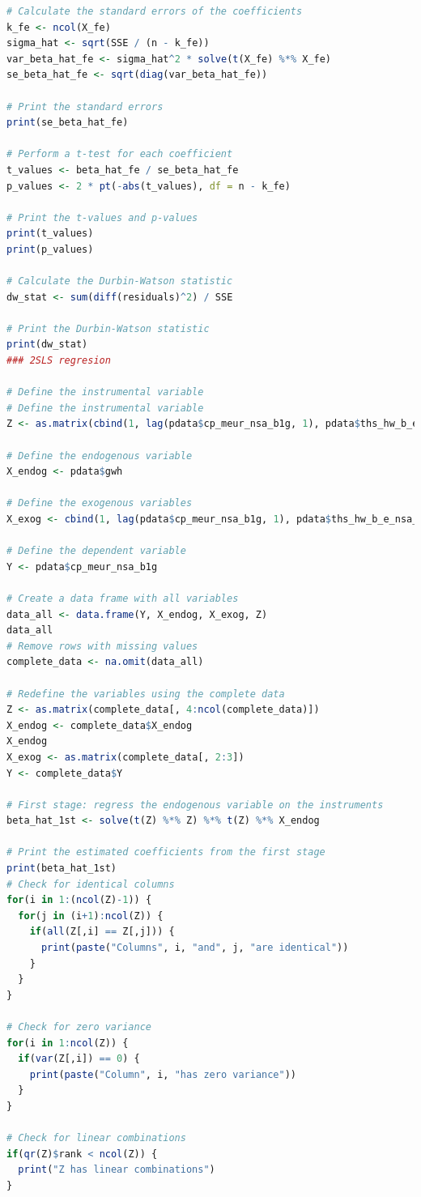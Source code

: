 \documentclass[12pt]{article}
\begin{document}
\begin{lstlisting}[language=R]
# Calculate the standard errors of the coefficients
k_fe <- ncol(X_fe)
sigma_hat <- sqrt(SSE / (n - k_fe))
var_beta_hat_fe <- sigma_hat^2 * solve(t(X_fe) %*% X_fe)
se_beta_hat_fe <- sqrt(diag(var_beta_hat_fe))

# Print the standard errors
print(se_beta_hat_fe)

# Perform a t-test for each coefficient
t_values <- beta_hat_fe / se_beta_hat_fe
p_values <- 2 * pt(-abs(t_values), df = n - k_fe)

# Print the t-values and p-values
print(t_values)
print(p_values)

# Calculate the Durbin-Watson statistic
dw_stat <- sum(diff(residuals)^2) / SSE

# Print the Durbin-Watson statistic
print(dw_stat)
### 2SLS regresion

# Define the instrumental variable
# Define the instrumental variable
Z <- as.matrix(cbind(1, lag(pdata$cp_meur_nsa_b1g, 1), pdata$ths_hw_b_e_nsa_emp_dc - pdata$exp_e7000_gwh))

# Define the endogenous variable
X_endog <- pdata$gwh

# Define the exogenous variables
X_exog <- cbind(1, lag(pdata$cp_meur_nsa_b1g, 1), pdata$ths_hw_b_e_nsa_emp_dc - pdata$exp_e7000_gwh)

# Define the dependent variable
Y <- pdata$cp_meur_nsa_b1g

# Create a data frame with all variables
data_all <- data.frame(Y, X_endog, X_exog, Z)
data_all
# Remove rows with missing values
complete_data <- na.omit(data_all)

# Redefine the variables using the complete data
Z <- as.matrix(complete_data[, 4:ncol(complete_data)])
X_endog <- complete_data$X_endog
X_endog
X_exog <- as.matrix(complete_data[, 2:3])
Y <- complete_data$Y

# First stage: regress the endogenous variable on the instruments
beta_hat_1st <- solve(t(Z) %*% Z) %*% t(Z) %*% X_endog

# Print the estimated coefficients from the first stage
print(beta_hat_1st)
# Check for identical columns
for(i in 1:(ncol(Z)-1)) {
  for(j in (i+1):ncol(Z)) {
    if(all(Z[,i] == Z[,j])) {
      print(paste("Columns", i, "and", j, "are identical"))
    }
  }
}

# Check for zero variance
for(i in 1:ncol(Z)) {
  if(var(Z[,i]) == 0) {
    print(paste("Column", i, "has zero variance"))
  }
}

# Check for linear combinations
if(qr(Z)$rank < ncol(Z)) {
  print("Z has linear combinations")
}


\end{lstlisting}
\end{document}
